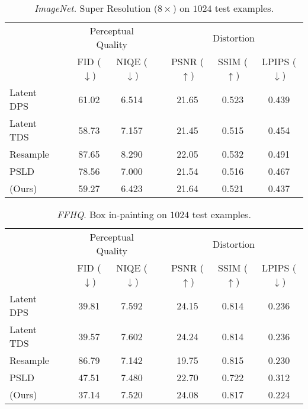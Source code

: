 \begin{table*}[!h]
\centering
\caption{\textit{ImageNet}. Super Resolution ($8\times$) on $1024$ test examples.}
\begin{tabular}{l c cc c ccc}
    \toprule
    && \multicolumn{2}{c}{Perceptual Quality} && \multicolumn{3}{c}{Distortion}\\
    \cmidrule(l){3-4}  \cmidrule(l){6-8}
    && FID ($\downarrow$) & NIQE ($\downarrow$) && PSNR ($\uparrow$) & SSIM ($\uparrow$) & LPIPS ($\downarrow$) \\
    \midrule
    Latent DPS && 61.02 & 6.514 && 21.65 & 0.523 & 0.439\\
    Latent TDS && 58.73 & 7.157 && 21.45 & 0.515 & 0.454\\
    Resample && 87.65 & 8.290 && 22.05 & 0.532 & 0.491\\
    PSLD && 78.56 & 7.000 && 21.54 & 0.516 & 0.467\\ 
    \midrule
    \MN{} (Ours) && 59.27 & 6.423 && 21.64 & 0.521 & 0.437\\ 
    \bottomrule
    \end{tabular}
\label{tab:sr_imagenet}
\end{table*}

\begin{table*}[!h]
\centering
\caption{\textit{FFHQ}. Box in-painting on $1024$ test examples.}
\begin{tabular}{l c cc c ccc}
    \toprule
    && \multicolumn{2}{c}{Perceptual Quality} && \multicolumn{3}{c}{Distortion}\\
    \cmidrule(l){3-4}  \cmidrule(l){6-8}
    && FID ($\downarrow$) & NIQE ($\downarrow$) && PSNR ($\uparrow$) & SSIM ($\uparrow$) & LPIPS ($\downarrow$) \\
    \midrule
    Latent DPS && 39.81 & 7.592 && 24.15 & 0.814 & 0.236\\
    Latent TDS && 39.57 & 7.602 && 24.24 & 0.814 & 0.236\\
    Resample && 86.79 & 7.142 && 19.75 & 0.815 & 0.230\\
    PSLD && 47.51 & 7.480 && 22.70 & 0.722 & 0.312\\ 
    \midrule
    \MN{} (Ours) && 37.14 & 7.520 && 24.08 & 0.817 & 0.224\\ 
    \bottomrule
    \end{tabular}
\label{tab:ib_ffhq}
\end{table*}

